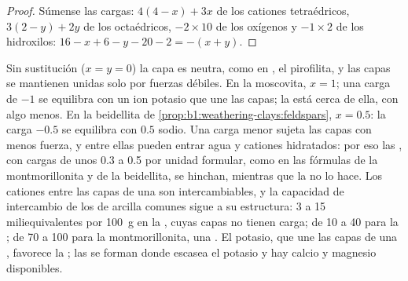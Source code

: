 \begin{proof}
Súmense las cargas: $4(4 - x) + 3x$ de los cationes tetraédricos, $3(2 - y) + 2y$
de los octaédricos, $-2\times10$ de los oxígenos y $-1\times2$ de los hidroxilos: $16 - x + 6 - y - 20 - 2 = -(x + y)$.
\end{proof}

Sin sustitución ($x = y = 0$) la capa es neutra, como en , el  pirofilita, y las capas se mantienen unidas solo por fuerzas
débiles. En la moscovita, $x = 1$; una carga de $-1$ se equilibra con un ion potasio que une las capas; la  está cerca de ella, con algo menos.
En la beidellita de \cref{prop:b1:weathering-clays:feldspars}, $x = 0.5$: la carga $-0.5$ se equilibra con $0.5$ sodio. Una carga menor sujeta las capas
con menos fuerza, y entre ellas pueden entrar agua y cationes hidratados: por eso las , con cargas de unos 0.3 a 0.5 por unidad formular, como
en las fórmulas de la montmorillonita y de la beidellita, se hinchan, mientras que la  no lo hace. Los cationes entre las capas de una  son
intercambiables, y la capacidad de intercambio de los  de arcilla comunes sigue a su estructura: 3 a 15 miliequivalentes por
\qty{100}{g} en la , cuyas capas no tienen carga; de 10 a 40 para la ; de 70 a 100 para la montmorillonita, una .
El potasio, que une las capas de una , favorece la ; las  se forman donde escasea el potasio y hay calcio y magnesio disponibles.


